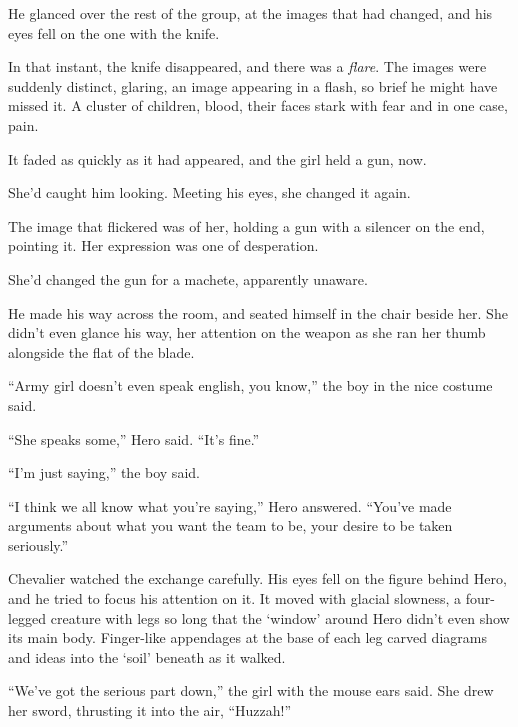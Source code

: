He glanced over the rest of the group, at the images that had changed, and his eyes fell on the one with the knife.



In that instant, the knife disappeared, and there was a \emph{flare}.  The images were suddenly distinct, glaring, an image appearing in a flash, so brief he might have missed it.  A cluster of children, blood, their faces stark with fear and in one case, pain.



It faded as quickly as it had appeared, and the girl held a gun, now.



She'd caught him looking.  Meeting his eyes, she changed it again.



The image that flickered was of her, holding a gun with a silencer on the end, pointing it.  Her expression was one of desperation.



She'd changed the gun for a machete, apparently unaware.



He made his way across the room, and seated himself in the chair beside her.  She didn't even glance his way, her attention on the weapon as she ran her thumb alongside the flat of the blade.



``Army girl doesn't even speak english, you know,'' the boy in the nice costume said.



``She speaks some,'' Hero said.  ``It's fine.''



``I'm just saying,'' the boy said.



``I think we all know what you're saying,'' Hero answered.  ``You've made arguments about what you want the team to be, your desire to be taken seriously.''



Chevalier watched the exchange carefully.  His eyes fell on the figure behind Hero, and he tried to focus his attention on it.  It moved with glacial slowness, a four-legged creature with legs so long that the `window' around Hero didn't even show its main body.  Finger-like appendages at the base of each leg carved diagrams and ideas into the `soil' beneath as it walked.



``We've got the serious part down,'' the girl with the mouse ears said.  She drew her sword, thrusting it into the air, ``Huzzah!''



